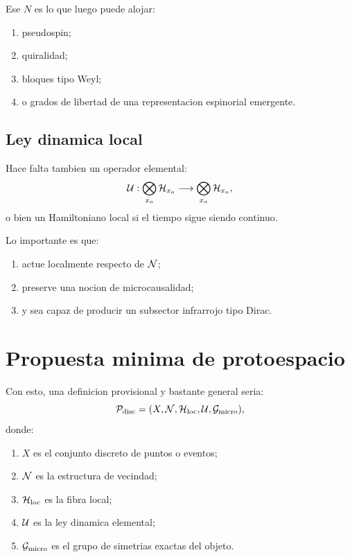 Ese \(N\) es lo que luego puede alojar:
\begin{enumerate}[label=\arabic*.]
    \item pseudospin;
    \item quiralidad;
    \item bloques tipo Weyl;
    \item o grados de libertad de una representacion espinorial emergente.
\end{enumerate}

\subsection{Ley dinamica local}
Hace falta tambien un operador elemental:
\begin{equation}
\mathcal{U}:\bigotimes_{x_a}\mathcal{H}_{x_a}\longrightarrow \bigotimes_{x_a}\mathcal{H}_{x_a},
\end{equation}
o bien un Hamiltoniano local si el tiempo sigue siendo continuo.

Lo importante es que:
\begin{enumerate}[label=\arabic*.]
    \item actue localmente respecto de \(\mathcal{N}\);
    \item preserve una nocion de microcausalidad;
    \item y sea capaz de producir un subsector infrarrojo tipo Dirac.
\end{enumerate}

\section{Propuesta minima de protoespacio}
Con esto, una definicion provisional y bastante general seria:
\begin{equation}
\mathcal{P}_{\mathrm{disc}}=(X,\mathcal{N},\mathcal{H}_{\mathrm{loc}},\mathcal{U},\mathcal{G}_{\mathrm{micro}}),
\label{c30:eq:proto}
\end{equation}
donde:
\begin{enumerate}[label=\arabic*.]
    \item \(X\) es el conjunto discreto de puntos o eventos;
    \item \(\mathcal{N}\) es la estructura de vecindad;
    \item \(\mathcal{H}_{\mathrm{loc}}\) es la fibra local;
    \item \(\mathcal{U}\) es la ley dinamica elemental;
    \item \(\mathcal{G}_{\mathrm{micro}}\) es el grupo de simetrias exactas del objeto.
\end{enumerate}

